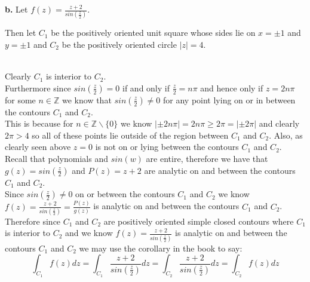 \documentclass{article}
\begin{document}
{\Large\textbf{b.}} Let $f(z) =\frac{z + 2}{sin(\frac{z}{2})}$.
\begin{center}
    \doublespacing
    Then let $C_1$ be the positively oriented unit square whose sides lie on $x =\pm 1$ and $y =\pm 1$ and $C_2$ be the positively oriented circle $|z| = 4$.\\
    \\Clearly $C_1$ is interior to $C_2$.
    \\Furthermore since $sin(\frac{z}{2}) = 0$ if and only if $\frac{z}{2} = n\pi$ and hence only if $z = 2n\pi$ for some $n\in\mathbb{Z}$ we know that $sin(\frac{z}{2})\neq 0$ for any point lying on or in between the contours $C_1$ and $C_2$.
    \\This is because for $n\in\mathbb{Z}\backslash\{0\}$ we know $|\pm 2n\pi| = 2n\pi\geq 2\pi = |\pm 2\pi|$ and clearly $2\pi > 4$ so all of these points lie outside of the region between $C_1$ and $C_2$. Also, as clearly seen above $z = 0$ is not on or lying between the contours $C_1$ and $C_2$.
    \break
    \\Recall that polynomials and $sin(w)$ are entire, therefore we have that $g(z) = sin(\frac{z}{2})$ and $P(z) = z + 2$ are analytic on and between the contours $C_1$ and $C_2$.
    \\Since $sin(\frac{z}{2})\neq 0$ on or between the contours $C_1$ and $C_2$ we know $f(z) =\frac{z + 2}{sin(\frac{z}{2})} =\frac{P(z)}{g(z)}$ is analytic on and between the contours $C_1$ and $C_2$.
    \\Therefore since $C_1$ and $C_2$ are positively oriented simple closed contours where $C_1$ is interior to $C_2$ and we know $f(z) =\frac{z + 2}{sin(\frac{z}{2})}$ is analytic on and between the contours $C_1$ and $C_2$ we may use the corollary in the book to say:
    \[\int _{C_1} f(z) dz =\int _{C_1}\frac{z + 2}{sin(\frac{z}{2})} dz =\int _{C_2}\frac{z + 2}{sin(\frac{z}{2})} dz =\int _{C_2} f(z) dz\]
    \qedsymbol
\end{center}
\end{document}
